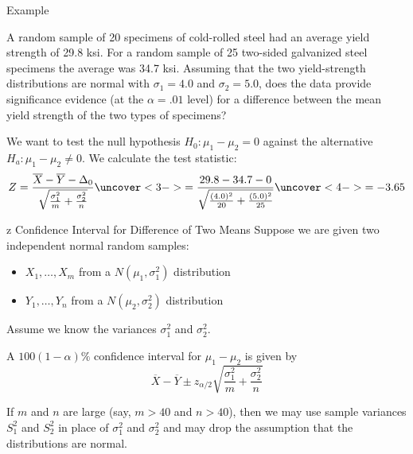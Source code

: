 \documentclass[t,handout]{beamer}
\begin{document}
    \begin{frame}{Example}
    \begin{block}{}
    A random sample of 20 specimens of cold-rolled steel had an average yield strength of 29.8 ksi. For a random sample of 25 two-sided galvanized steel specimens the average was 34.7 ksi. Assuming that the two yield-strength distributions are normal with $\sigma_1=4.0$ and $\sigma_2=5.0$, does the data provide significance evidence (at the $\alpha=.01$ level) for a difference between the mean yield strength of the two types of specimens?
    \end{block}
    
    \pause We want to test the null hypothesis $H_0: \mu_1-\mu_2=0$ against the alternative $H_a: \mu_1-\mu_2\neq 0$. \pause We calculate the test statistic:
    $$Z=\frac{\overline X-\overline Y-\Delta_0}{\sqrt{\frac{\sigma_1^2}m+\frac{\sigma_2^2}n}}
    \uncover<3->{= \frac{29.8-34.7-0}{\sqrt{\frac{(4.0)^2}{20}+\frac{(5.0)^2}{25}}}}
    \uncover<4->{=-3.65}$$
    
    \end{frame}
    
    \begin{frame}{z Confidence Interval for Difference of Two Means}
    Suppose we are given two independent normal random samples:
    \begin{itemize}
    \item $X_1,\dots,X_m$ from a $N(\mu_1,\sigma_1^2)$ distribution
    \item $Y_1,\dots,Y_n$ from a $N(\mu_2,\sigma_2^2)$ distribution
    \end{itemize}
    \pause Assume we know the variances $\sigma_1^2$ and $\sigma_2^2$.
    \pause \begin{block}{}
    A $100(1-\alpha)\%$ confidence interval for $\mu_1-\mu_2$ is given by
    $$\overline{X} - \overline{Y} \pm z_{\alpha/2}\sqrt{\frac{\sigma_1^2}m+\frac{\sigma_2^2}n}$$
    \end{block}
    \pause If $m$ and $n$ are large (say, $m>40$ and $n>40$), then we may use sample variances $S_1^2$ and $S_2^2$ in place of $\sigma_1^2$ and $\sigma_2^2$ and may drop the assumption that the distributions are normal.
    \end{frame}
    
\end{document}
